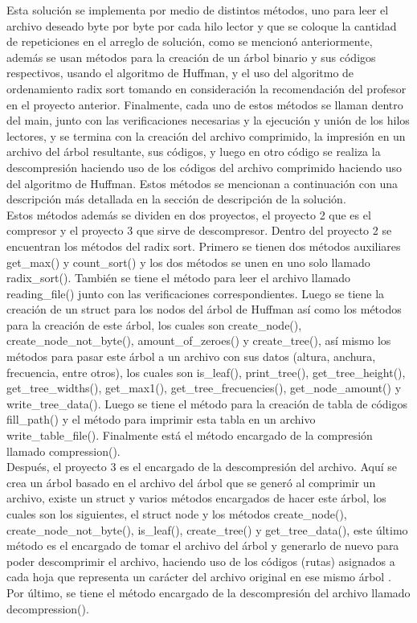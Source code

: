 \documentclass[12pt, article, natbib]{IEEEtran}
\begin{document}
Esta solución se implementa por medio de distintos métodos, uno para leer el archivo deseado byte por byte por cada hilo lector y que se coloque la cantidad de repeticiones en el arreglo de solución, como se mencionó anteriormente, además se usan métodos para la creación de un árbol binario y sus códigos respectivos, usando el algoritmo de Huffman, y el uso del algoritmo de ordenamiento radix sort\cite{geeksforgeeks_2013_radix} tomando en consideración la recomendación del profesor en el proyecto anterior. Finalmente, cada uno de estos métodos se llaman dentro del main, junto con las verificaciones necesarias y la ejecución y unión de los hilos lectores, y se termina con la creación del archivo comprimido, la impresión en un archivo del árbol resultante, sus códigos, y luego en otro código se realiza la descompresión haciendo uso de los códigos del archivo comprimido haciendo uso del algoritmo de Huffman. Estos métodos se mencionan a continuación con una descripción más detallada en la sección de descripción de la solución.\\

Estos métodos además se dividen en dos proyectos, el proyecto 2 que es el compresor y el proyecto 3 que sirve de descompresor. Dentro del proyecto 2 se encuentran los métodos del radix sort. Primero se tienen dos métodos auxiliares get\_max() y count\_sort() y los dos métodos se unen en uno solo llamado radix\_sort(). También se tiene el método para leer el archivo llamado reading\_file() junto con las verificaciones correspondientes. Luego se tiene la creación de un struct para los nodos del árbol de Huffman así como los métodos para la creación de este árbol, los cuales son create\_node(), create\_node\_not\_byte(), amount\_of\_zeroes() y create\_tree(), así mismo los métodos para pasar este árbol a un archivo con sus datos (altura, anchura, frecuencia, entre otros), los cuales son is\_leaf(), print\_tree(), get\_tree\_height(), get\_tree\_widths(), get\_max1(), get\_tree\_frecuencies(), get\_node\_amount() y write\_tree\_data(). Luego se tiene el método para la creación de tabla de códigos fill\_path() y el método para imprimir esta tabla en un archivo write\_table\_file(). Finalmente está el método encargado de la compresión llamado compression().\\

Después, el proyecto 3 es el encargado de la descompresión del archivo. Aquí se crea un árbol basado en el archivo del árbol que se generó al comprimir un archivo, existe un struct y varios métodos encargados de hacer este árbol, los cuales son los siguientes, el struct node y los métodos create\_node(), create\_node\_not\_byte(), is\_leaf(), create\_tree() y get\_tree\_data(), este último método es el encargado de tomar el archivo del árbol y generarlo de nuevo para poder descomprimir el archivo, haciendo uso de los códigos (rutas) asignados a cada hoja que representa un carácter del archivo original en ese mismo árbol\cite{rao_strings} \cite{cppreferencecom_2022_strtoul} \cite{riptutorial_c}. Por último, se tiene el método encargado de la descompresión del archivo llamado decompression().\\
\end{document}
